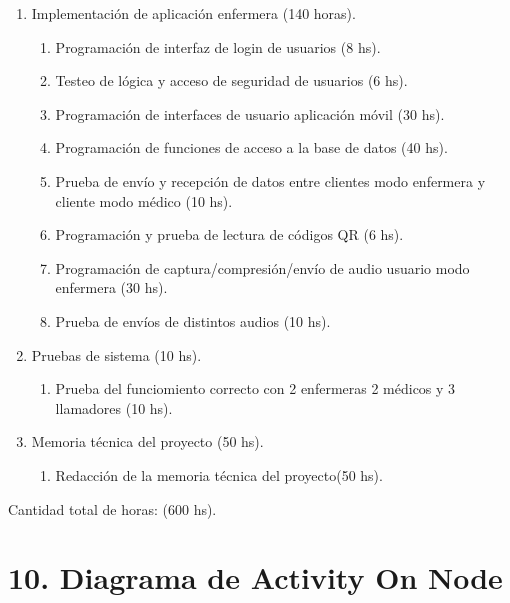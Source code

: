 \documentclass[
11pt, %
]{charter}
\begin{document}
\begin{enumerate}
\item Implementación de aplicación enfermera (140 horas).
	\begin{enumerate}
	\item Programación de interfaz de login de usuarios (8 hs).
	\item Testeo de lógica y acceso de seguridad de usuarios (6 hs).
	\item Programación de interfaces de usuario aplicación móvil (30 hs).
	\item Programación de funciones de acceso a la base de datos (40 hs).
	\item Prueba de envío y recepción de datos entre clientes modo enfermera y cliente modo médico (10 hs).
	\item Programación y prueba de lectura de códigos QR (6 hs).
	\item Programación de captura/compresión/envío de audio usuario modo enfermera (30 hs).
	\item Prueba de envíos de distintos audios (10 hs).
	\end{enumerate}
	
\item Pruebas de sistema (10 hs).
	\begin{enumerate}	
	\item Prueba del funciomiento correcto con 2 enfermeras 2 médicos y 3 llamadores (10 hs).
	\end{enumerate}	

\item Memoria técnica del proyecto (50 hs).
	\begin{enumerate}	
	\item Redacción de la memoria técnica del proyecto(50 hs).
	\end{enumerate}	
		
	
\end{enumerate}

Cantidad total de horas: (600 hs).

\newpage 


\section{10. Diagrama de Activity On Node}
\label{sec:AoN}


\end{document}
